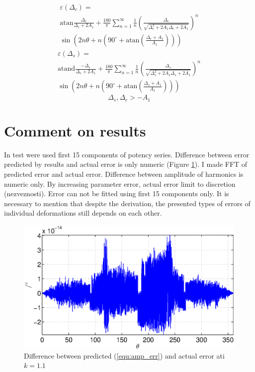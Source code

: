 \documentclass[a4paper]{article}
\begin{document}
\begin{multline}
\label{equ:dc_err}
\varepsilon(\Delta_c) =\\ \mathrm{atan}\frac{\Delta_c}{\Delta_c+2 A_1}+\frac{180}{\pi} \sum_{n=1}^{\infty}\frac{1}{n} (\frac{\Delta_c}{\sqrt{\Delta_c^2+2 A_1 \Delta_c+2 A_1}})^n\\ \sin (2n \theta+n (90^\circ+ \mathrm{ atan}(\frac{\Delta_c+A_1}{A_1})))
\end{multline}
\begin{multline}
\label{equ:ds_err}
\varepsilon(\Delta_s) =\\ \mathrm{atand}\frac{-\Delta_s}{\Delta_s+2 A_1}+\frac{180}{\pi} \sum_{n=1}^{\infty}\frac{1}{n} (\frac{\Delta_s}{\sqrt{\Delta_s^2+2 A_1 \Delta_s+2A_1}})^n\\ \sin (2n \theta+n (90^\circ+ \mathrm{ atan}(\frac{\Delta_s+A_1}{A_1})))
\end{multline}
\begin{equation*}
\Delta_s, \Delta_c > -A_1
\end{equation*}



\section{Comment on results}

In test were used first 15  components of potency series. Difference between error predicted by results and actual error is only numeric (Figure \ref{fig:razlika}).
I made FFT of predicted error and actual error. Difference between amplitude of harmonics is numeric only. By increasing parameter error, actual error limit to discretion (nezveznosti). Error can not be fitted using first 15 components only. It is necessary to mention that despite the derivation, the presented types of errors of individual deformations still depends on each other.

\begin{figure}[!htb]
	\begin{center}
		\includegraphics[width=\linewidth]{./Slike/razlika_amp.eps}
		\caption{Difference between predicted (\ref{equ:amp_err}) and actual error ati $k=1.1$} \label{fig:razlika}
	\end{center}
\end{figure}
\end{document}
